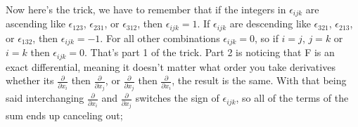 \documentclass{article}
\begin{document}
Now here's the trick, we have to remember that if the integers in \begin{math} \epsilon_{ijk} \end{math} are ascending like \begin{math} \epsilon_{123} \end{math}, \begin{math} \epsilon_{231} \end{math}, or \begin{math} \epsilon_{312} \end{math}, then \begin{math} \epsilon_{ijk} = 1 \end{math}. If \begin{math} \epsilon_{ijk} \end{math} are descending like \begin{math} \epsilon_{321} \end{math}, \begin{math} \epsilon_{213} \end{math}, or \begin{math} \epsilon_{132} \end{math}, then \begin{math} \epsilon_{ijk} = -1 \end{math}. For all other combinations \begin{math} \epsilon_{ijk} = 0 \end{math}, so if \begin{math} i = j \end{math}, \begin{math} j = k \end{math} or \begin{math} i = k \end{math} then \begin{math} \epsilon_{ijk} = 0 \end{math}. That's part 1 of the trick. Part 2 is noticing that F is an exact differential, meaning it doesn't matter what order you take derivatives whether its \begin{math} \frac{\partial}{\partial{x_i}} \end{math} then \begin{math} \frac{\partial}{\partial{x_j}} \end{math}, or \begin{math} \frac{\partial}{\partial{x_j}} \end{math} then \begin{math} \frac{\partial}{\partial{x_i}} \end{math}, the result is the same. With that being said interchanging \begin{math} \frac{\partial}{\partial{x_i}} \end{math} and \begin{math} \frac{\partial}{\partial{x_j}} \end{math} switches the sign of \begin{math} \epsilon_{ijk} \end{math}, so all of the terms of the sum ends up canceling out;
\end{document}
